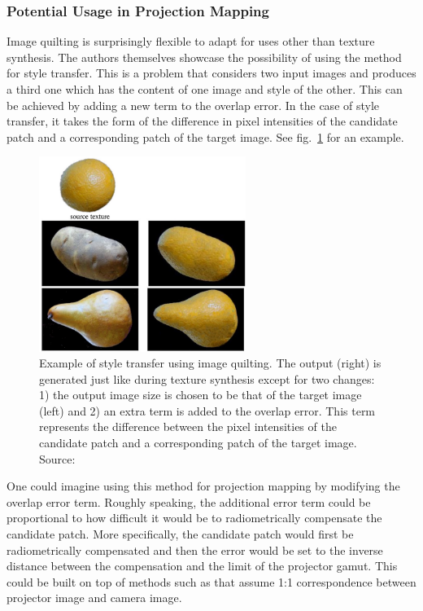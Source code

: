 \subsubsection{Potential Usage in Projection Mapping}
\label{section:background-texture_synthesis-patch_based-projection_mapping}

Image quilting is surprisingly flexible to adapt for uses other than texture synthesis. The authors themselves showcase the possibility of using the method for style transfer. This is a problem that considers two input images and produces a third one which has the content of one image and style of the other. This can be achieved by adding a new term to the overlap error. In the case of style transfer, it takes the form of the difference in pixel intensities of the candidate patch and a corresponding patch of the target image. See fig.~\ref{fig:background_quilting_transfer} for an example.

\begin{figure}[ht]
    \centering
    \includegraphics[width=0.6\textwidth]{images/02-quilting_transfer.jpg}
    \caption{Example of style transfer using image quilting. The output (right) is generated just like during texture synthesis except for two changes: 1) the output image size is chosen to be that of the target image (left) and 2) an extra term is added to the overlap error. This term represents the difference between the pixel intensities of the candidate patch and a corresponding patch of the target image. Source: \citet{Efros2001}}
    \label{fig:background_quilting_transfer}
\end{figure}

One could imagine using this method for projection mapping by modifying the overlap error term. Roughly speaking, the additional error term could be proportional to how difficult it would be to radiometrically compensate the candidate patch. More specifically, the candidate patch would first be radiometrically compensated and then the error would be set to the inverse distance between the compensation and the limit of the projector gamut. This could be built on top of methods such as \citet{Grundhofer2015} that assume 1:1 correspondence between projector image and camera image.

